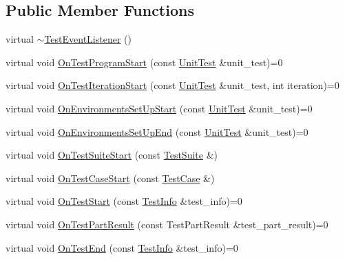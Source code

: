 \subsection*{Public Member Functions}
\begin{DoxyCompactItemize}
\item 
virtual \mbox{\hyperlink{classtesting_1_1_test_event_listener_a4512d19e7a108ec4926239ec1ea85d63}{$\sim$\+Test\+Event\+Listener}} ()
\item 
virtual void \mbox{\hyperlink{classtesting_1_1_test_event_listener_a5f6c84f39851e8a603a2d2e10063816b}{On\+Test\+Program\+Start}} (const \mbox{\hyperlink{classtesting_1_1_unit_test}{Unit\+Test}} \&unit\+\_\+test)=0
\item 
virtual void \mbox{\hyperlink{classtesting_1_1_test_event_listener_a60cc09b7907cb329d152eb5e7133bdeb}{On\+Test\+Iteration\+Start}} (const \mbox{\hyperlink{classtesting_1_1_unit_test}{Unit\+Test}} \&unit\+\_\+test, int iteration)=0
\item 
virtual void \mbox{\hyperlink{classtesting_1_1_test_event_listener_aa6502e534919605be45f26a6daf9a40c}{On\+Environments\+Set\+Up\+Start}} (const \mbox{\hyperlink{classtesting_1_1_unit_test}{Unit\+Test}} \&unit\+\_\+test)=0
\item 
virtual void \mbox{\hyperlink{classtesting_1_1_test_event_listener_aaa1021d75f5dbf3f05c829c1cc520341}{On\+Environments\+Set\+Up\+End}} (const \mbox{\hyperlink{classtesting_1_1_unit_test}{Unit\+Test}} \&unit\+\_\+test)=0
\item 
virtual void \mbox{\hyperlink{classtesting_1_1_test_event_listener_a2726cc70dfda861f109355f1d9f09dfe}{On\+Test\+Suite\+Start}} (const \mbox{\hyperlink{classtesting_1_1_test_suite}{Test\+Suite}} \&)
\item 
virtual void \mbox{\hyperlink{classtesting_1_1_test_event_listener_ac48628c9f78d3e10bff77c7366e9e780}{On\+Test\+Case\+Start}} (const \mbox{\hyperlink{classtesting_1_1_test_case}{Test\+Case}} \&)
\item 
virtual void \mbox{\hyperlink{classtesting_1_1_test_event_listener_ab4f6a0ca16ae75daf385b3b5914e1048}{On\+Test\+Start}} (const \mbox{\hyperlink{classtesting_1_1_test_info}{Test\+Info}} \&test\+\_\+info)=0
\item 
virtual void \mbox{\hyperlink{classtesting_1_1_test_event_listener_a054f8705c883fa120b91473aff38f2ee}{On\+Test\+Part\+Result}} (const Test\+Part\+Result \&test\+\_\+part\+\_\+result)=0
\item 
virtual void \mbox{\hyperlink{classtesting_1_1_test_event_listener_abb1c44525ef038500608b5dc2f17099b}{On\+Test\+End}} (const \mbox{\hyperlink{classtesting_1_1_test_info}{Test\+Info}} \&test\+\_\+info)=0

\end{DoxyCompactItemize}
